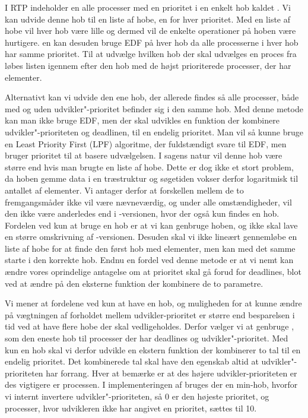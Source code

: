 I RTP  indeholder \sched en alle processer med en prioritet i en enkelt hob kaldet . Vi kan udvide denne hob til en liste af hobe, en for hver prioritet. Med en liste af hobe vil hver hob være lille og dermed vil de enkelte operationer på hoben være hurtigere. \Sched en kan desuden bruge EDF på hver hob da alle processerne i hver hob har samme prioritet. Til at udvælge hvilken hob der skal udvælges en proces fra løbes listen igennem efter den hob med de højst prioriterede processer, der har elementer. 

Alternativt kan vi udvide den ene hob, der allerede findes så alle processer, både med og uden udvikler"-prioritet befinder sig i den samme hob. Med denne metode kan man ikke bruge EDF, men der skal udvikles en  funktion der kombinere  udvikler"-prioriteten og deadlinen, til en endelig prioritet. Man vil så kunne bruge en Least Priority First (LPF) algoritme, der fuldstændigt svare til EDF, men bruger prioritet til at basere udvælgelsen. I sagens natur vil denne hob  være større end hvis man brugte en liste af hobe. Dette er dog ikke et stort problem, da hoben gemme data i en træstruktur og  søgetiden vokser derfor logaritmisk til antallet af elementer. Vi antager derfor at forskellen mellem de to fremgangsmåder ikke vil være nævneværdig, og under alle omstændigheder, vil den ikke være anderledes end i -versionen, hvor der også kun findes en hob. Fordelen ved kun at bruge en hob er at vi kan genbruge  hoben, og  ikke skal lave en større omskrivning af -versionen. Desuden skal vi ikke lineært gennemløbe en liste af hobe for at finde den først hob med elementer, men kan med det samme starte i den korrekte hob. Endnu en fordel ved denne metode er at vi nemt kan  ændre vores oprindelige antagelse om at prioritet skal gå forud for deadlines, blot ved at ændre på den eksterne funktion der kombinere de to parametre.

Vi mener at fordelene ved kun at have en hob, og muligheden for at kunne ændre på vægtningen af forholdet mellem udvikler-prioritet er større end besparelsen i tid ved at have flere hobe der skal vedligeholdes. Derfor vælger vi  at genbruge , som den eneste hob til  processer der har deadlines og udvikler"-prioritet. Med kun en hob skal vi derfor udvikle en ekstern funktion der kombinerer to tal til en endelig prioritet. Det kombinerede tal skal have den egenskab altid at udvikler"-prioriteten har forrang. Hver at bemærke er at des højere udvikler-prioriteten er des vigtigere er processen. I implementeringen af  bruges der en min-hob, hvorfor vi internt invertere udvikler"-prioriteten, så 0 er den højeste prioritet, og processer, hvor udvikleren ikke har angivet en prioritet, sættes til 10.

